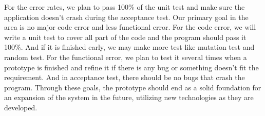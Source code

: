 \documentclass[onecolumn, draftclsnofoot,10pt, compsoc]{IEEEtran}
\begin{document}
For the error rates, we plan to pass 100\% of the unit test and make sure the application doesn't crash during the acceptance test. Our primary goal in the area is no major code error and less functional error. For the code error, we will write a unit test to cover all part of the code and the program should pass it 100\%. And if it is finished early, we may make more test like mutation test and random test. For the functional error, we plan to test it several times when a prototype is finished and refine it if there is any bug or something doesn’t fit the requirement. And in acceptance test, there should be no bugs that crash the program. \newline
Through these goals, the prototype should end as a solid foundation for an expansion of the system in the future, utilizing new technologies as they are developed.
\end{document}
